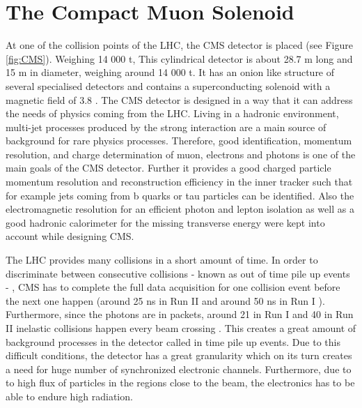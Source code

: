 \section{The Compact Muon Solenoid}
At one of the collision points of the LHC, the CMS detector\cite{CMS, Bayatian:2006zz,Bayatian:922757} is placed (see Figure \ref{fig:CMS}). Weighing 14 000 \si{ \tonne}, This cylindrical detector is about 28.7 \si{ \meter} long and 15 \si{ \meter} in diameter, weighing around 14 000 \si{ \tonne}. It has an onion like structure of several specialised detectors and contains a superconducting solenoid with a magnetic field of 3.8 \si{ \Tesla}. The CMS detector is designed in a way that it can address the needs of physics coming from the LHC. Living in a hadronic environment, multi-jet processes produced by the strong interaction are a main source of background for rare physics processes. Therefore, good identification, momentum resolution, and charge determination of muon, electrons and photons is one of the main goals of the CMS detector. Further it provides a good charged particle momentum resolution and reconstruction efficiency in the inner tracker such that for example jets coming from b quarks or tau particles can be identified. Also the electromagnetic resolution for an efficient photon and lepton isolation as well as a good hadronic calorimeter for the missing transverse energy were kept into account while designing CMS. 

The LHC provides many collisions in a short amount of time. In order to discriminate between consecutive collisions - known as out of time pile up events - , CMS has to complete the full data acquisition for one collision event before the next one happen (around 25 \si{ \nano \second} in Run II and around 50 \si{ \nano \second} in Run I \cite{OLuanaigh:2051986}). Furthermore, since the photons are in packets, around 21 in Run I and 40 in Run II  inelastic collisions happen every beam crossing . This creates a great amount of background processes in the detector called in time pile up events. Due to this difficult conditions, the detector has a great granularity which on its turn creates a need for huge number of synchronized electronic channels. Furthermore, due to to high flux of particles in the regions close to the beam, the electronics has to be able to endure high radiation.


